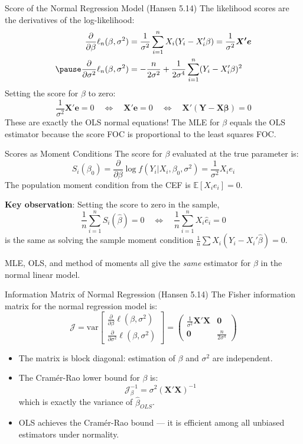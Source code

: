 \documentclass[aspectratio=169, handout, t]{beamer}
\numberwithin{equation}{section}
\begin{document}
\begin{frame}{Score of the Normal Regression Model (Hansen 5.14)}
The likelihood scores are the derivatives of the log-likelihood:
\begin{align*}
\frac{\partial}{\partial \beta}\ell_n(\beta,\sigma^2)&=\frac{1}{\sigma^2}\sum_{i=1}^n X_i(Y_i-X_i'\beta)=\frac{1}{\sigma^2}\bm{X'e}\\\pause
\frac{\partial}{\partial \sigma^2}\ell_n(\beta,\sigma^2)&=-\frac{n}{2\sigma^2}+\frac{1}{2\sigma^4}\sum_{i=1}^n(Y_i-X_i'\beta)^2
\end{align*}\pause
Setting the score for $\beta$ to zero:
$$\frac{1}{\sigma^2}\bm{X'e}=0 \quad\Longleftrightarrow\quad \bm{X'e}=0 \quad\Longleftrightarrow\quad \bm{X'(Y-X\beta)}=0$$\pause
\medskip
These are exactly the \alert{OLS normal equations}!  The MLE for $\beta$ equals the OLS estimator because the score FOC is proportional to the least squares FOC.
\end{frame}

\begin{frame}{Scores as Moment Conditions}
The score for $\beta$ evaluated at the true parameter is:
$$S_i(\beta_0)=\frac{\partial}{\partial \beta}\log f(Y_i|X_i,\beta_0,\sigma^2)=\frac{1}{\sigma^2}X_i e_i$$\pause
The population moment condition from the CEF is $\mathbb{E}[X_i e_i]=0$.\pause

\medskip
\textbf{Key observation}: Setting the score to zero in the sample,
$$\frac{1}{n}\sum_{i=1}^n S_i(\hat{\beta})=0 \quad\Longleftrightarrow\quad \frac{1}{n}\sum_{i=1}^n X_i\hat{e}_i=0$$
is the \alert{same} as solving the sample moment condition $\frac{1}{n}\sum X_i(Y_i - X_i'\hat{\beta})=0$.\pause

\smallskip
MLE, OLS, and method of moments all give the \emph{same} estimator for $\beta$ in the normal linear model.
\end{frame}

\begin{frame}{Information Matrix of Normal Regression (Hansen 5.14)}
The Fisher information matrix for the normal regression model is:
$$\mathcal{J}=\text{var}\begin{bmatrix}\frac{\partial}{\partial \beta}\ell(\beta,\sigma^2)\\\frac{\partial}{\partial \sigma^2}\ell(\beta,\sigma^2)\end{bmatrix}=\begin{pmatrix}\frac{1}{\sigma^2}\bm{X'X} & \bm{0}\\\bm{0} & \frac{n}{2\sigma^4}\end{pmatrix}$$\pause
\begin{itemize}
\item The matrix is \alert{block diagonal}: estimation of $\beta$ and $\sigma^2$ are independent.
\item The Cram\'{e}r-Rao lower bound for $\beta$ is:
$$\mathcal{J}_\beta^{-1}=\sigma^2(\bm{X'X})^{-1}$$
which is exactly the variance of $\hat{\beta}_{OLS}$.\pause
\item OLS \alert{achieves the Cram\'{e}r-Rao bound} --- it is efficient among all unbiased estimators under normality.
\end{itemize}
\end{frame}
\end{document}
